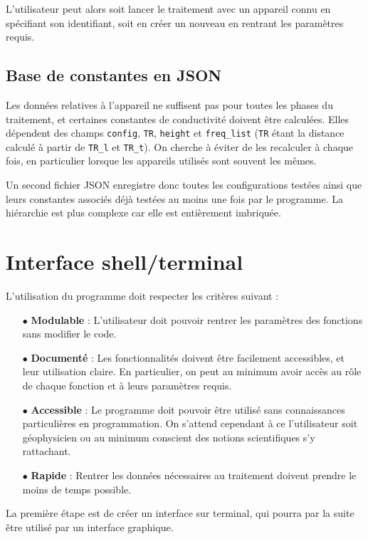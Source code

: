 \documentclass[12pt]{article}
\begin{document}
    L'utilisateur peut alors soit lancer le traitement avec un appareil connu en spécifiant son identifiant, soit en créer un nouveau en rentrant les paramètres requis.

\subsection{Base de constantes en JSON}
    Les données relatives à l'appareil ne suffisent pas pour toutes les phases du traitement, et certaines constantes de conductivité doivent être calculées. Elles dépendent des champs \texttt{config}, \texttt{TR}, \texttt{height} et \texttt{freq\_list} (\texttt{TR} étant la distance calculé à partir de \texttt{TR\_l} et \texttt{TR\_t}). On cherche à éviter de les recalculer à chaque fois, en particulier lorsque les appareils utilisés sont souvent les mêmes.

    Un second fichier JSON enregistre donc toutes les configurations testées ainsi que leurs constantes associés déjà testées au moins une fois par le programme. La hiérarchie est plus complexe car elle est entièrement imbriquée.

\newpage
\section{Interface shell/terminal}

    L'utilisation du programme doit respecter les critères suivant :
    \begin{enumerate}
        \item[$\bullet$] \textbf{Modulable} : L'utilisateur doit pouvoir rentrer les paramètres des fonctions sans modifier le code.
        \item[$\bullet$] \textbf{Documenté} : Les fonctionnalités doivent être facilement accessibles, et leur utilisation claire. En particulier, on peut au minimum avoir accès au rôle de chaque fonction et à leurs paramètres requis.
        \item[$\bullet$] \textbf{Accessible} : Le programme doit pouvoir être utilisé sans connaissances particulières en programmation. On s'attend cependant à ce l'utilisateur soit géophysicien ou au minimum conscient des notions scientifiques  s'y rattachant.
        \item[$\bullet$] \textbf{Rapide} : Rentrer les données nécessaires au traitement doivent prendre le moins de temps possible.
    \end{enumerate}

    La première étape est de créer un interface sur terminal, qui pourra par la suite être utilisé par un interface graphique.
\end{document}
